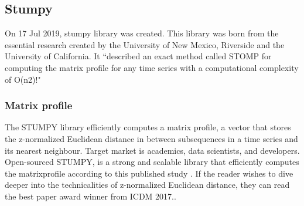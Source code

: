
\subsection{Stumpy}
On 17 Jul 2019, stumpy library was created. This library was born from the essential research created by the  University of New Mexico, Riverside and the University of California. It ``described an exact method called STOMP for computing the matrix profile for any time series with a computational complexity of O(n2)!" \cite{law2019stumpy} 

\subsubsection{Matrix profile} 
The STUMPY library efficiently computes a matrix profile, a vector that stores the z-normalized Euclidean distance in between subsequences in a time series and its nearest neighbour. Target market is academics, data scientists, and developers. Open-sourced STUMPY, is a strong and scalable library that efficiently computes the matrixprofile according to this published study \cite{law2019stumpy}. If the reader wishes to dive deeper into the technicalities of z-normalized Euclidean distance, they can read the best paper award winner from ICDM 2017.\cite{zhu_imamura_nikovski_keogh_2017}.

